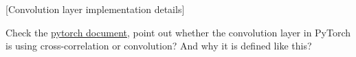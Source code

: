 \item {} [Convolution layer implementation details]

Check the \href{https://pytorch.org/docs/stable/generated/torch.nn.Conv2d.html#torch.nn.Conv2d}{pytorch document}, point out whether the convolution layer in PyTorch is using cross-correlation or convolution? And why it is defined like this? 

\solution










\newpage